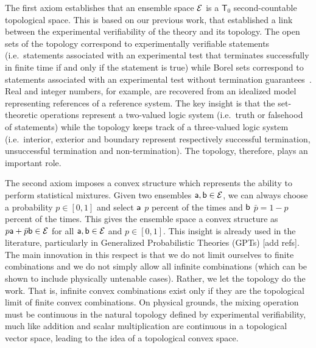 The first axiom establishes that an ensemble space $\Ens$ is a $\mathsf{T}_0$ second-countable topological space. This is based on our previous work, that established a link between the experimental verifiability of the theory and its topology. The open sets of the topology correspond to experimentally verifiable statements (i.e.~statements associated with an experimental test that terminates successfully in finite time if and only if the statement is true) while Borel sets correspond to statements associated with an experimental test without termination guarantees~\cite{aop-book,aop-topExpDisting}. Real and integer numbers, for example, are recovered from an idealized model representing references of a reference system. The key insight is that the set-theoretic operations represent a two-valued logic system (i.e.~truth or falsehood of statements) while the topology keeps track of a three-valued logic system (i.e.~interior, exterior and boundary represent respectively successful termination, unsuccessful termination and non-termination). The topology, therefore, plays an important role.

The second axiom imposes a convex structure which represents the ability to perform statistical mixtures. Given two ensembles $\ens[a], \ens[b] \in \Ens$, we can always choose a probability $p \in [0,1]$ and select $\ens[a]$ $p$ percent of the times and $\ens[b]$ $\bar{p} = 1-p$ percent of the times. This gives the ensemble space a convex structure as $p \ens[a] + \bar{p} \ens[b] \in \Ens$ for all $\ens[a], \ens[b] \in \Ens$ and $p \in [0,1]$. This insight is already used in the literature, particularly in Generalized Probabilistic Theories (GPTs) [add refs]. The main innovation in this respect is that we do not limit ourselves to finite combinations and we do not simply allow all infinite combinations (which can be shown to include physically untenable cases). Rather, we let the topology do the work. That is, infinite convex combinations exist only if they are the topological limit of finite convex combinations. On physical grounds, the mixing operation must be continuous in the natural topology defined by experimental verifiability, much like addition and scalar multiplication are continuous in a topological vector space, leading to the idea of a topological convex space.

